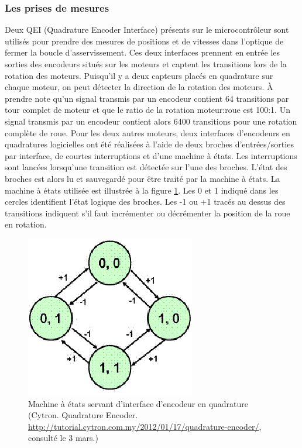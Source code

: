 \subsubsection{Les prises de mesures}
\label{asservissement_mesures}
Deux QEI (Quadrature Encoder Interface) présents sur le microcontrôleur sont utilisés pour prendre des mesures de positions et de vitesses dans l'optique de fermer la boucle d'asservissement. Ces deux interfaces prennent en entrée les sorties des encodeurs situés sur les moteurs et captent les transitions lors de la rotation des moteurs. Puisqu'il y a deux capteurs placés en quadrature sur chaque moteur, on peut détecter la direction de la rotation des moteurs. À prendre note qu'un signal transmis par un encodeur contient 64 transitions par tour complet de moteur et que le ratio de la rotation moteur:roue est 100:1. Un signal transmis par un encodeur contient alors 6400 transitions pour une rotation complète de roue. Pour les deux autres moteurs, deux interfaces d'encodeurs en quadratures logicielles ont été réalisées à l'aide de deux broches d'entrées/sorties par interface, de courtes interruptions et d'une machine à états. Les interruptions sont lancées lorsqu'une transition est détectée sur l'une des broches. L'état des broches est alors lu et sauvegardé pour être traité par la machine à états. La machine à états utilisée est illustrée à la figure \ref{fig:cytron_machine_etats}. Les 0 et 1 indiqué dans les cercles identifient l'état logique des broches. Les -1 ou +1 tracés au dessus des transitions indiquent s'il faut incrémenter ou décrémenter la position de la roue en rotation.
\begin{figure}[htbp]
\centering
\includegraphics[scale=0.7]{fig/cytron_machine_etats.png}
\caption{Machine à états servant d'interface d'encodeur en quadrature (Cytron. Quadrature Encoder. \url{http://tutorial.cytron.com.my/2012/01/17/quadrature-encoder/}, consulté le 3 mars.)}
\label{fig:cytron_machine_etats}
\end{figure}
